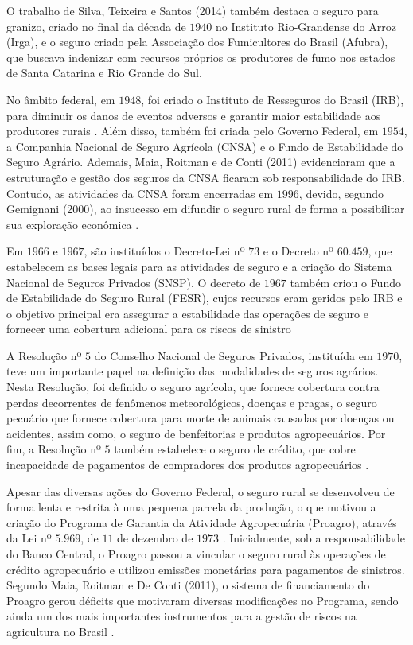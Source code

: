 \documentclass[12pt,a4paper]{article}
\begin{document}
O trabalho de Silva, Teixeira e Santos (2014) também destaca o seguro para granizo, criado no final da década de $1940$ no Instituto Rio-Grandense do Arroz (Irga), e o seguro criado pela Associação dos Fumicultores do Brasil (Afubra), que buscava indenizar com recursos próprios os produtores de fumo nos estados de Santa Catarina e Rio Grande do Sul.

No âmbito federal, em $1948$, foi criado o Instituto de  Resseguros do Brasil (IRB), para diminuir os danos de eventos adversos e garantir maior estabilidade aos produtores rurais \cite{silva14}. Além disso, também foi criada pelo Governo Federal, em $1954$, a Companhia Nacional de Seguro Agrícola (CNSA) e o Fundo de Estabilidade do Seguro Agrário. Ademais, Maia,  Roitman e de Conti (2011) evidenciaram que a estruturação e gestão dos seguros da CNSA ficaram sob responsabilidade do IRB. Contudo, as atividades da CNSA foram encerradas em $1996$, devido, segundo Gemignani (2000), ao insucesso em difundir o seguro rural de forma a possibilitar sua exploração econômica \cite{maia11, silva14}.

Em $1966$ e $1967$, são instituídos o Decreto-Lei nº $73$ e o Decreto nº $60.459$, que estabelecem as bases legais para as atividades de seguro e a criação do Sistema Nacional de Seguros Privados (SNSP). O decreto de $1967$ também criou o Fundo de Estabilidade do Seguro Rural (FESR), cujos recursos eram geridos pelo IRB e o objetivo principal era assegurar a estabilidade das operações de seguro e fornecer uma cobertura adicional para os riscos de sinistro \cite{silva14}

A Resolução nº $5$ do Conselho Nacional de Seguros Privados, instituída em $1970$, teve um importante papel na definição das modalidades de seguros agrários. Nesta Resolução, foi definido o seguro agrícola, que fornece cobertura contra perdas decorrentes de fenômenos meteorológicos, doenças e pragas, o seguro pecuário que fornece cobertura para morte de animais causadas por doenças ou acidentes, assim como, o seguro de benfeitorias e produtos agropecuários. Por fim, a Resolução nº $5$ também estabelece o seguro de crédito, que cobre incapacidade de pagamentos de compradores dos produtos agropecuários \cite{silva14}.

Apesar das diversas ações do Governo Federal, o seguro rural se desenvolveu de forma lenta e restrita à uma pequena parcela da produção, o que motivou a criação do Programa de Garantia da Atividade Agropecuária (Proagro), através da Lei nº $5.969$, de $11$ de dezembro de $1973$ \cite{silva14}. Inicialmente, sob a responsabilidade do Banco Central, o Proagro passou a vincular o seguro rural às operações de crédito agropecuário e utilizou emissões monetárias para pagamentos de sinistros. Segundo Maia, Roitman e De Conti (2011), o sistema de financiamento do Proagro gerou déficits que motivaram diversas modificações no Programa, sendo ainda um dos mais importantes instrumentos para a gestão de riscos na agricultura no Brasil \cite{maia11}.
\end{document}
